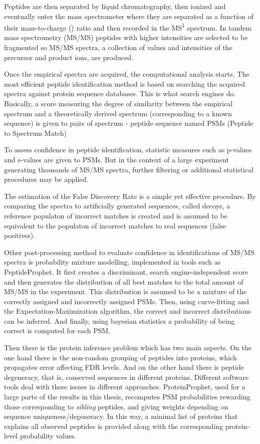 Peptides are then separated by liquid chromatography, then ionized
and eventually enter the mass spectrometer where they are separated
as a function of their mass-to-charge (\mz) ratio and then recorded in the MS\textsuperscript{1} spectrum.
In tandem mass spectrometry (MS/MS)
peptides with higher intensities are selected to be fragmented so 
MS/MS spectra, a collection of \mz values and intensities of the precursor and product ions, are produced.

Once the empirical spectra are acquired, the computational analysis starts.
The most efficient peptide identification method is based on searching 
the acquired spectra against protein sequence databases. This is what
search engines do. Basically, a score measuring the degree of similarity 
between the empirical spectrum and a theoretically derived spectrum (corresponding to a known 
sequence) is given to pairs of spectrum - peptide sequence named PSMs (Peptide to Spectrum Match)

To assess confidence in peptide identification, statistic measures such
as p-values and e-values are given to PSMs. But in the context of a large
experiment generating thousands of MS/MS spectra, further filtering or additional
statistical procedures may be applied.

The estimation of the False Discovery Rate is a simple yet effective procedure. By comparing the 
spectra to artificially generated sequences, called decoys, a reference populaton 
of incorrect matches is created and is assumed to be equivalent to the populaton
of incorrect matches to real sequences (false positives).

Other post-processing method to evaluate confidence in identifications of MS/MS spectra 
is probability mixture modelling, implemented in tools such as PeptideProphet. It 
first creates a discriminant, search engine-independent score and then generates
the distribution of all best matches to the total amount of MS/MS in the experiment.
This distribution is assumed to be a mixture of the correctly assigned and incorrectly assigned
PSMs. Then, using curve-fitting and the Expectation-Maximization algorithm, the correct
and incorrect distributions can be inferred. And finally, using bayesian statistics
a probability of being correct is computed for each PSM.

Then there is the protein inference problem which has two main aspects.
On the one hand there is the non-random grouping of peptides into proteins, 
which propagates error affecting FDR levels. And on the other hand there is 
peptide degeneracy, that is, conserved sequences in different proteins.
Different software tools deal with these issues in different approaches. 
ProteinProphet, used for a large parte of the results in this thesis, recomputes
PSM probabilities rewarding those corresponding to \emph{sibling} peptides, 
and giving weights depending on sequence uniqueness/degeneracy. 
In this way, a minimal list of proteins that explains all observed peptides
is provided along with the corresponding protein-level probability values.

